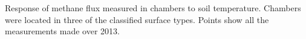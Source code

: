 \label{fig:Fch4vsT_byVeg_ch} Response of methane flux measured
in chambers to soil temperature. Chambers were located in three of the
classified surface types. Points show all the measurements made over
2013.